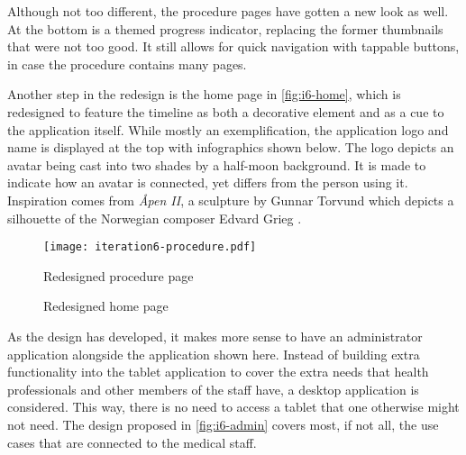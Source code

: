 Although not too different, the procedure pages have gotten a new look as well. At the bottom is a themed progress indicator, replacing the former thumbnails that were not too good. It still allows for quick navigation with tappable buttons, in case the procedure contains many pages.

Another step in the redesign is the home page in \autoref{fig:i6-home}, which is redesigned to feature the timeline as both a decorative element and as a cue to the application itself. While mostly an exemplification, the application logo and name is displayed at the top with infographics shown below. The logo depicts an avatar being cast into two shades by a half-moon background. It is made to indicate how an avatar is connected, yet differs from the person using it. Inspiration comes from \emph{Åpen II}, a sculpture by Gunnar Torvund which depicts a silhouette of the Norwegian composer Edvard Grieg \autocite{vaage2014}.

\begin{sidewaysfigure}
    \centering
    \hspace{\fill}
    \begin{minipage}[t]{0.35\textwidth}
        \centering
        \vspace{0pt}
        \texttt{[image: iteration6-procedure.pdf]}
        \caption{Redesigned procedure page}
        \label{fig:i6-procedure}
    \end{minipage}
    \hspace{\fill}
    \begin{minipage}[t]{0.35\textwidth}
        \centering
        \vspace{0pt}
        \caption{Redesigned home page}
        \label{fig:i6-home}
    \end{minipage}
    \hspace*{\fill}
\end{sidewaysfigure}

As the design has developed, it makes more sense to have an administrator application alongside the application shown here. Instead of building extra functionality into the tablet application to cover the extra needs that health professionals and other members of the staff have, a desktop application is considered. This way, there is no need to access a tablet that one otherwise might not need. The design proposed in \autoref{fig:i6-admin} covers most, if not all, the use cases that are connected to the medical staff.

